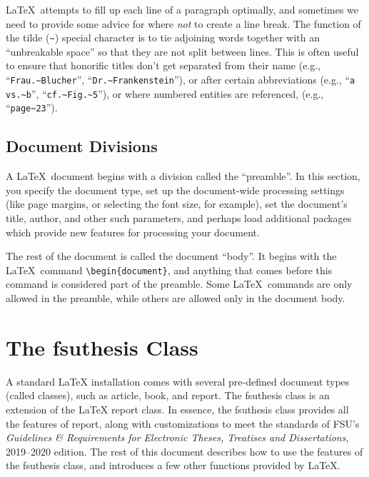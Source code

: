 \documentclass[11pt,letterpaper]{ltxdockit}[2011/03/25]
\newcommand*{\booktitle}[1]{\textit{#1}}
\newcommand*{\pkg}[1]{\textsf{#1}}
\newcommand*{\fsuth}{\pkg{fsuthesis}}
\renewcommand{\-}{\discretionary{}{}{}}
\begin{document}
\LaTeX\ attempts to fill up each line of a paragraph optimally, and
sometimes we need to provide some advice for where \emph{not} to
create a line break.  The function of the tilde (\verb|~|) special
character is to tie adjoining words together with an ``unbreakable
space'' so that they
are not split between lines.  This is often useful to ensure that
honorific titles don't get separated from their name (e.g.,
``\verb|Frau.~Blucher|'', ``\verb|Dr.~Frankenstein|''), or after
certain abbreviations (e.g., ``\verb|a vs.~b|'',
``\verb|cf.~Fig.~5|''), or where numbered entities are referenced,
(e.g., ``\verb|page~23|'').

\subsection{Document Divisions} 
A \LaTeX\ document begins with a division called the
``preamble''.  In this section, you specify the
document type, set up the document-wide processing settings (like page
margins, or selecting the font size, for example), set the document's
title, author, and other such parameters, and perhaps load additional
packages which provide new features for processing your document.

The rest of the document is called the document ``body''.  It begins
with the \LaTeX\ command
\verb|\begin{document}|,
and anything that comes before this command is considered part of the
preamble. Some \LaTeX\ commands are only allowed in the preamble,
while others are allowed only in the document body.

\section{The \fsuth{} Class}
\label{sec:class}

A standard \LaTeX{} installation comes with several pre-defined
document types (called classes), such as \pkg{article},
\pkg{book}, and \pkg{report}.  The \fsuth{} class is an
extension of the \LaTeX{} \pkg{report} class.  In essence, the
\fsuth{} class provides all the features of \pkg{report}, along
with customizations to meet the standards of FSU's
\booktitle{Guidelines \& Requirements for Electronic Theses, Treatises
  and Dissertations}, 2019--2020 edition.  The rest of this
document describes how to use the features of the \fsuth{} class, and
introduces a few other functions provided by \LaTeX.
\end{document}
